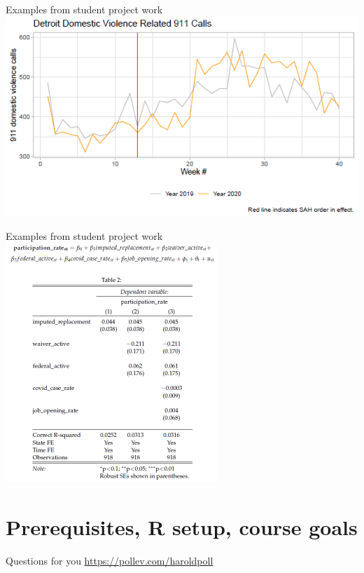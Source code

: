 \documentclass[
  8pt,
  ignorenonframetext,
  dvipsnames]{beamer}
\begin{document}
\begin{frame}{Examples from student project work}
\protect\hypertarget{examples-from-student-project-work-1}{}
\includegraphics{nm-ca_chart1.png}
\end{frame}

\begin{frame}{Examples from student project work}
\protect\hypertarget{examples-from-student-project-work-2}{}
\includegraphics[width=0.6\textwidth,height=\textheight]{ps_ra_regtable.png}
\end{frame}

\hypertarget{prerequisites-r-setup-course-goals}{%
\section{Prerequisites, R setup, course
goals}\label{prerequisites-r-setup-course-goals}}

\begin{frame}{Questions for you}
\protect\hypertarget{questions-for-you}{}
\url{https://pollev.com/haroldpoll}
\end{frame}
\end{document}
